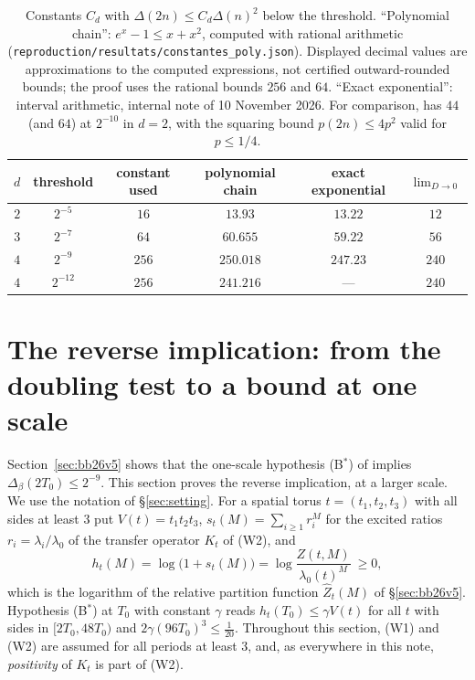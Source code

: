 \documentclass[11pt,a4paper]{article}
\theoremstyle{plain}
\theoremstyle{definition}
\theoremstyle{remark}
\numberwithin{equation}{section}
\begin{document}
\begin{table}[ht]
\centering\footnotesize
\begin{tabular}{@{}cccccc@{}}
\toprule
$d$ & threshold & constant used & polynomial chain & exact exponential \cite{internal} & $\lim_{D\to0}$ \\
\midrule
$2$ & $2^{-5}$ & $16$ & $13.93$ & $13.22$ & $12$ \\
$3$ & $2^{-7}$ & $64$ & $60.655$ & $59.22$ & $56$ \\
$4$ & $2^{-9}$ & $256$ & $250.018$ & $247.23$ & $240$ \\
$4$ & $2^{-12}$ & $256$ & $241.216$ & --- & $240$ \\
\bottomrule
\end{tabular}
\caption{Constants $C_d$ with $\Delta(2n)\le C_d\Delta(n)^2$ below the threshold. ``Polynomial chain'': $e^x-1\le x+x^2$, computed
with rational arithmetic (\texttt{reproduction/resultats/constantes\_poly.json}). Displayed decimal values are approximations to the computed expressions, not certified outward-rounded bounds; the proof uses the rational bounds $256$ and $64$. ``Exact exponential'': interval arithmetic, internal note of 10 November 2026. For
comparison, \cite[(2.12)]{OAI26} has $44$ (and $64$) at $2^{-10}$ in $d=2$, with the squaring bound $p(2n)\le4p^2$ valid for
$p\le1/4$.}
\label{tab:const}
\end{table}

\section{The reverse implication: from the doubling test to a bound at one scale}\label{sec:reverse}

Section~\ref{sec:bb26v5} shows that the one-scale hypothesis (B$^*$) of \cite{BB26v5} implies $\Delta_\beta(2T_0)\le2^{-9}$. This section
proves the reverse implication, at a larger scale. We use the notation of \S\ref{sec:setting}. For a spatial torus $t=(t_1,t_2,t_3)$ with all sides at least $3$ put
$V(t)=t_1t_2t_3$, $s_t(M)=\sum_{i\ge1}r_i^M$ for the excited ratios $r_i=\lambda_i/\lambda_0$ of the transfer operator $K_t$ of (W2), and
\[
h_t(M)=\log\bigl(1+s_t(M)\bigr)=\log\frac{Z(t,M)}{\lambda_0(t)^M}\ \ge0,
\]
which is the logarithm of the relative partition function $\widehat Z_t(M)$ of \S\ref{sec:bb26v5}. Hypothesis (B$^*$) at $T_0$ with constant $\gamma$ reads
$h_t(T_0)\le\gamma V(t)$ for all $t$ with sides in $[2T_0,48T_0)$ and $2\gamma(96T_0)^3\le\frac1{20}$. Throughout this section, (W1) and (W2) are
assumed for all periods at least $3$, and, as everywhere in this note, \emph{positivity} of $K_t$ is part of (W2).
\end{document}
